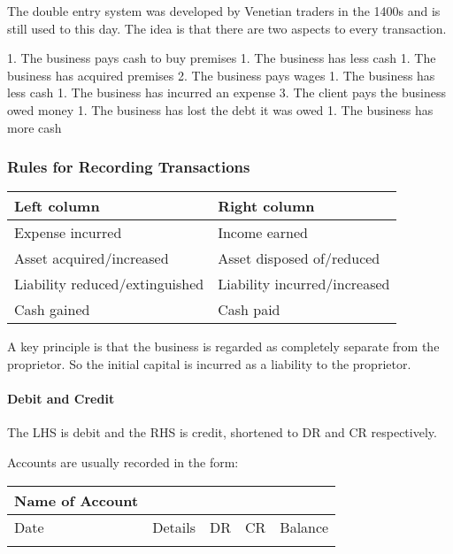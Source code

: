 \documentclass[
]{article}
\newenvironment{Shaded}{}{}
\newcommand{\NormalTok}[1]{#1}
\begin{document}
The double entry system was developed by Venetian traders in the 1400s
and is still used to this day. The idea is that there are two aspects to
every transaction.

\begin{Shaded}
\begin{Highlighting}[]
\NormalTok{1. The business pays cash to buy premises}
\NormalTok{    1. The business has less cash}
\NormalTok{    1. The business has acquired premises}
\NormalTok{2. The business pays wages}
\NormalTok{    1. The business has less cash}
\NormalTok{    1. The business has incurred an expense}
\NormalTok{3. The client pays the business owed money}
\NormalTok{    1. The business has lost the debt it was owed}
\NormalTok{    1. The business has more cash}
\end{Highlighting}
\end{Shaded}

\hypertarget{rules-for-recording-transactions}{%
\subsubsection{Rules for Recording
Transactions}\label{rules-for-recording-transactions}}

\begin{longtable}[]{@{}ll@{}}
\toprule()
Left column & Right column \\
\midrule()
\endhead
Expense incurred & Income earned \\
Asset acquired/increased & Asset disposed of/reduced \\
Liability reduced/extinguished & Liability incurred/increased \\
Cash gained & Cash paid \\
\bottomrule()
\end{longtable}

A key principle is that the business is regarded as completely separate
from the proprietor. So the initial capital is incurred as a liability
to the proprietor.

\hypertarget{debit-and-credit}{%
\paragraph{Debit and Credit}\label{debit-and-credit}}

The LHS is debit and the RHS is credit, shortened to DR and CR
respectively.

Accounts are usually recorded in the form:

\begin{longtable}[]{@{}llccc@{}}
\toprule()
Name of Account & & & & \\
\midrule()
\endhead
Date & Details & DR & CR & Balance \\
& & & & \\
\bottomrule()
\end{longtable}
\end{document}
